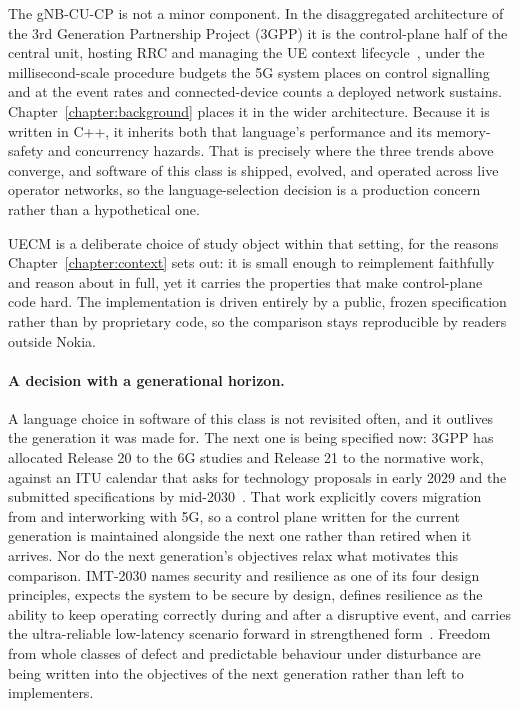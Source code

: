 \documentclass[english,twoside,openright,a4paper,censored,csm,software-track-2020]{HYthesisML}
\begin{document}
The gNB-CU-CP is not a minor component. In the disaggregated architecture of the 3rd
Generation Partnership Project (3GPP) it is the
control-plane half of the central unit, hosting RRC and managing the UE context
lifecycle~\cite{3gpp38401,3gpp38331}, under the millisecond-scale procedure budgets the 5G system
places on control signalling~\cite{3gpp38913} and at the event rates and connected-device counts
a deployed network sustains. Chapter~\ref{chapter:background} places it in the wider architecture.
Because it is written in C++, it inherits both that language's performance and its memory-safety
and concurrency hazards. That is precisely where the three trends above converge, and software of
this class is shipped, evolved, and operated across live operator networks, so the
language-selection decision is a production concern rather than a hypothetical one.

UECM is a deliberate choice of study object within that setting, for the reasons
Chapter~\ref{chapter:context} sets out: it is small enough to reimplement faithfully and reason about in
full, yet it carries the properties that make control-plane code hard. The implementation is
driven entirely by a public, frozen specification rather than by proprietary code, so the
comparison stays reproducible by readers outside Nokia.

\paragraph{A decision with a generational horizon.}
A language choice in software of this class is not revisited often, and it outlives the
generation it was made for. The next one is being specified now: 3GPP has allocated Release 20 to
the 6G studies and Release 21 to the normative work, against an ITU calendar that asks for
technology proposals in early 2029 and the submitted specifications by
mid-2030~\cite{3gpp2024road6g}. That work explicitly covers migration from and interworking with
5G, so a control plane written for the current generation is maintained alongside the next one
rather than retired when it arrives. Nor do the next generation's objectives relax what motivates
this comparison. IMT-2030 names security and resilience as one of its four design principles,
expects the system to be secure by design, defines resilience as the ability to keep operating
correctly during and after a disruptive event, and carries the ultra-reliable low-latency scenario
forward in strengthened form~\cite{itu2023imt2030}. Freedom from whole classes of defect and
predictable behaviour under disturbance are being written into the objectives of the next
generation rather than left to implementers.
\end{document}
